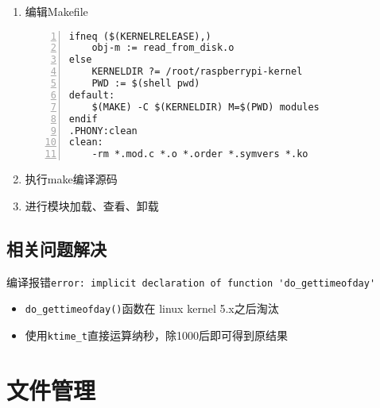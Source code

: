 \documentclass{article}
\begin{document}
\begin{enumerate}
\begin{lstlisting}[numbers=left]
#define buf_size 1024
#define read_times 524288

MODULE_LICENSE("GPL");

static int __init read_disk_init(void)
{
	struct file *fp_read;
	char buf[buf_size];
	int i;
	ktime_t startTime = 0;
	ktime_t endTime = 0;
	int read_time;
	loff_t pos;
	printk("Start read_from_disk module...\n");
	fp_read = filp_open("/home/tmp_file", O_RDONLY, 0);
	if (IS_ERR(fp_read)) {
		printk("Failed to open file...\n");
		return -1;
	}

    startTime = ktime_get_real();
	pos = 0;
	for(i = 0; i < read_times; i++)	{
		kernel_read(fp_read, buf, buf_size, &pos);
	}
	endTime = ktime_get_real();
	filp_close(fp_read, NULL);
	read_time = (endTime - startTime) / 1000;
	printk(KERN_ALERT "Read file costs %d us\n", read_time);	
	printk("Reading speed is %d M/s\n", buf_size * read_times / read_time);
	return 0;
}

static void __exit read_disk_exit(void)
{
	printk("Exit read_from_disk module...\n");
}

module_init(read_disk_init);
module_exit(read_disk_exit);

\end{lstlisting}
    \item 编辑Makefile
\begin{lstlisting}[numbers=left]
ifneq ($(KERNELRELEASE),)
	obj-m := read_from_disk.o
else
	KERNELDIR ?= /root/raspberrypi-kernel
	PWD := $(shell pwd)
default:
	$(MAKE) -C $(KERNELDIR) M=$(PWD) modules
endif
.PHONY:clean
clean:
	-rm *.mod.c *.o *.order *.symvers *.ko

\end{lstlisting}
    \item 执行make编译源码
    \item 进行模块加载、查看、卸载  
\end{enumerate}

\subsection{相关问题解决}
    编译报错\verb|error: implicit declaration of function 'do_gettimeofday'|
    \begin{itemize}
        \item \verb|do_gettimeofday()|函数在 linux kernel 5.x之后淘汰
        \item 使用\verb|ktime_t|直接运算纳秒，除1000后即可得到原结果
    \end{itemize}
\newpage
\section{文件管理}
\end{document}
